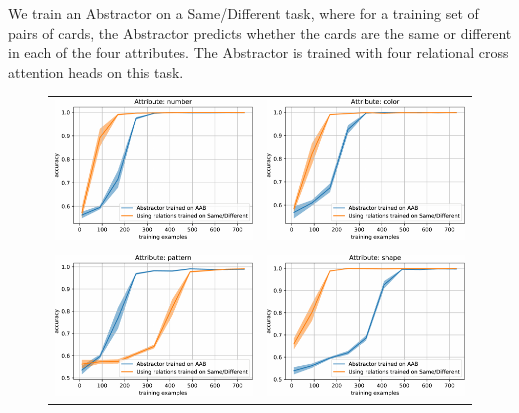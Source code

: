  We train an Abstractor on a Same/Different task, 
where for a training set of pairs of cards, the Abstractor predicts whether the cards are 
the same or different in each of the four attributes. The Abstractor is trained with 
four relational cross attention heads on this task.

\begin{figure}[t!]
	\begin{center}
	\begin{tabular}{cc}
		\includegraphics[width=.42\textwidth]{figures/set/AAB_comparison_number-crop} &
		\includegraphics[width=.42\textwidth]{figures/set/AAB_comparison_color-crop} \\
		&\\
		\includegraphics[width=.42\textwidth]{figures/set/AAB_comparison_pattern-crop} &
		\includegraphics[width=.42\textwidth]{figures/set/AAB_comparison_shape-crop}

\end{tabular}
\end{center}
\end{figure}
